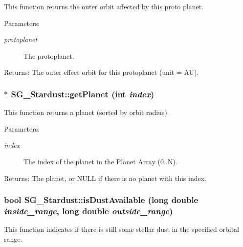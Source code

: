 This function returns the outer orbit affected by this proto planet. 

\begin{Desc}
\item[Parameters:]
\begin{description}
\item[{\em protoplanet}]The protoplanet. \end{description}
\end{Desc}
\begin{Desc}
\item[Returns:]The outer effect orbit for this protoplanet (unit = AU). \end{Desc}
\subsubsection{ $\ast$ SG\_\-Stardust::get\-Planet (int {\em index})}\label{class_s_g___stardust_a5}


This function returns a planet (sorted by orbit radius). 

\begin{Desc}
\item[Parameters:]
\begin{description}
\item[{\em index}]The index of the planet in the Planet Array (0..N). \end{description}
\end{Desc}
\begin{Desc}
\item[Returns:]The planet, or NULL if there is no planet with this index. \end{Desc}
\subsubsection{\setlength{\rightskip}{0pt plus 5cm}bool SG\_\-Stardust::is\-Dust\-Available (long double {\em inside\_\-range}, long double {\em outside\_\-range})\hspace{0.3cm}{\tt  [protected]}}\label{class_s_g___stardust_b0}


This function indicates if there is still some stellar dust in the specified orbital range. 


